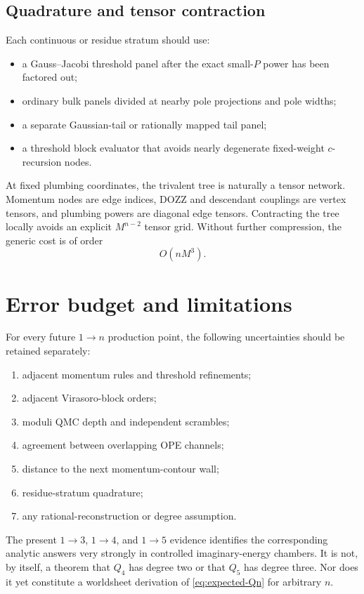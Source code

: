 \documentclass[11pt]{article}
\begin{document}
\subsection{Quadrature and tensor contraction}

Each continuous or residue stratum should use:
\begin{itemize}
  \item a Gauss--Jacobi threshold panel after the exact small-$P$ power has
  been factored out;
  \item ordinary bulk panels divided at nearby pole projections and pole
  widths;
  \item a separate Gaussian-tail or rationally mapped tail panel;
  \item a threshold block evaluator that avoids nearly degenerate
  fixed-weight $c$-recursion nodes.
\end{itemize}

At fixed plumbing coordinates, the trivalent tree is naturally a tensor
network.  Momentum nodes are edge indices, DOZZ and descendant couplings are
vertex tensors, and plumbing powers are diagonal edge tensors.  Contracting
the tree locally avoids an explicit $M^{n-2}$ tensor grid.  Without further
compression, the generic cost is of order
\begin{equation}
  O(nM^3).
\end{equation}

\section{Error budget and limitations}

For every future $1\to n$ production point, the following uncertainties
should be retained separately:
\begin{enumerate}
  \item adjacent momentum rules and threshold refinements;
  \item adjacent Virasoro-block orders;
  \item moduli QMC depth and independent scrambles;
  \item agreement between overlapping OPE channels;
  \item distance to the next momentum-contour wall;
  \item residue-stratum quadrature;
  \item any rational-reconstruction or degree assumption.
\end{enumerate}

The present $1\to3$, $1\to4$, and $1\to5$ evidence identifies the corresponding
analytic answers very strongly in controlled imaginary-energy chambers.  It
is not, by itself, a theorem that $Q_4$ has degree two or that $Q_5$ has
degree three.  Nor does it yet constitute a worldsheet derivation of
\eqref{eq:expected-Qn} for arbitrary $n$.
\end{document}
